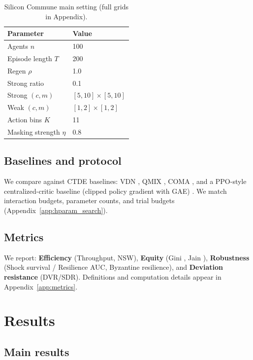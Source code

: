 \documentclass{article}
\theoremstyle{definition}
\theoremstyle{plain}
\theoremstyle{remark}
\begin{document}
\begin{table}[t]
\centering
\caption{Silicon Commune main setting (full grids in Appendix).}
\label{tab:env_config}
\begin{tabular}{ll}
\toprule
Parameter & Value \\
\midrule
Agents $n$ & 100 \\
Episode length $T$ & 200 \\
Regen $\rho$ & 1.0 \\
Strong ratio & 0.1 \\
Strong $(c,m)$ & $[5,10]\times[5,10]$ \\
Weak $(c,m)$ & $[1,2]\times[1,2]$ \\
Action bins $K$ & 11 \\
Masking strength $\eta$ & 0.8 \\
\bottomrule
\end{tabular}
\end{table}

\subsection{Baselines and protocol}
\label{sec:baselines}

We compare against CTDE baselines: VDN \citep{sunehag2017vdn}, QMIX \citep{rashid2018qmix}, COMA \citep{foerster2018coma}, and a PPO-style centralized-critic baseline (clipped policy gradient with GAE) \citep{schulman2016gae}.
We match interaction budgets, parameter counts, and trial budgets (Appendix~\ref{app:hparam_search}).

\subsection{Metrics}
\label{sec:metrics}

We report:
\textbf{Efficiency} (Throughput, NSW),
\textbf{Equity} (Gini \citep{gini1912variabilita}, Jain \citep{jain1984fairness}),
\textbf{Robustness} (Shock survival / Resilience AUC, Byzantine resilience),
and \textbf{Deviation resistance} (DVR/SDR).
Definitions and computation details appear in Appendix~\ref{app:metrics}.

\section{Results}
\label{sec:results}

\subsection{Main results}
\label{sec:main_results}
\end{document}
